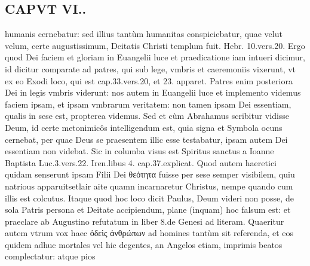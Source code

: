 \documentclass{article}
\begin{document}
\begin{pages}
\section*{CAPVT VI.. }
\marginpar{[ p.491 ]}\pstart humanis cernebatur: sed illius tantùm humanitas conspiciebatur, quae velut velum, certe augustissimum, Deitatis Christi templum fuit. Hebr. 10.vers.20. Ergo quod Dei faciem et gloriam in Euangelii luce et praedicatione iam intueri dicimur, id dicitur comparate ad patres, qui sub lege, vmbris et caeremoniis vixerunt, vt ex eo Exodi loco, qui est cap.33.vers.20, et 23. apparet. Patres enim posteriora Dei in legis vmbris viderunt: nos autem in Euangelii luce et implemento videmus faciem ipsam, et ipsam vmbrarum veritatem: non tamen ipsam Dei essentiam, qualis in sese est, propterea videmus. Sed et cùm Abrahamus scribitur vidisse Deum, id certe metonimicôs intelligendum est, quia signa et Symbola ocuns cernebat, per quae Deus se praesentem illic esse testabatur, ipsam autem Dei essentiam non videbat. Sic in columba visus est Spiritus sanctus a Ioanne Baptista Luc.3.vers.22. Iren.libus  4. cap.37.explicat.  \pend\pstart Quod autem haeretici quidam senserunt ipsam Filii Dei θεότητα fuisse per sese semper visibilem, quiu natrious apparuitsetlair aite quamn incarnaretur Christus, nempe quando cum illis est colcutus. Itaque quod hoc loco dicit Paulus, Deum videri non posse, de sola Patris persona et Deitate accipiendum, plane (inquam) hoc falsum est: et praeclare ab Augustino refutatum in liber 8.de Genesi ad literam.  \pend\pstart Quaeritur autem vtrum vox haec ὀδεὶς ἀνθρώπων ad homines tantùm sit referenda, et eos quidem adhuc mortales vel hic degentes, an Angelos etiam, imprimis beatos complectatur: atque pios  \pend

\end{pages}
\end{document}
